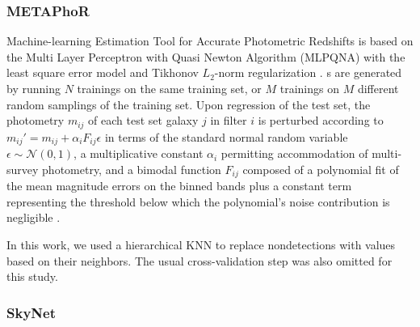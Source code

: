 \subsubsection{METAPhoR}

Machine-learning Estimation Tool for Accurate Photometric Redshifts \citep[\metaphor\footnote{\url{http://dame.dsf.unina.it}},][]{Cavuoti:17} is based on the Multi Layer Perceptron with Quasi Newton Algorithm (MLPQNA) with the least square error model and Tikhonov $L_{2}$-norm regularization \citep{Hofmann:18}.
\Pzpdf s are generated by running $N$ trainings on the same training set, or $M$ trainings on $M$ different random samplings of the training set.
Upon regression of the test set, the photometry $m_{ij}$ of each test set galaxy $j$ in filter $i$ is perturbed according to $m_{ij}' = m_{ij} + \alpha_{i} F_{ij} \epsilon$ in terms of the standard normal random variable $\epsilon \sim \mathcal{N}(0, 1)$, a multiplicative constant $\alpha_{i}$ permitting accommodation of multi-survey photometry, and a bimodal function $F_{ij}$ composed of a polynomial fit of the mean magnitude errors on the binned bands plus a constant term representing the threshold below which the polynomial's noise contribution is negligible \citep{Brescia:18}.

In this work, we used a hierarchical KNN to replace nondetections with values based on their neighbors.
The usual cross-validation step was also omitted for this study.

\subsubsection{SkyNet}

